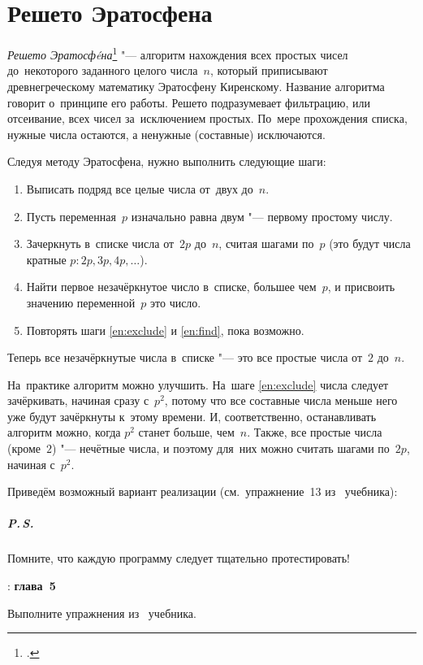\section{Решето Эратосфена}
\emph{Решето Эратосф\'eна}\footcite{Eratosthen:wiki} "--- алгоритм нахождения всех простых чисел до~некоторого заданного целого числа~\(n\), который приписывают древнегреческому математику Эратосфену Киренскому. Название алгоритма говорит о~принципе его работы. Решето подразумевает фильтрацию, или отсеивание, всех чисел за~исключением простых. По~мере прохождения списка, нужные числа остаются, а ненужные (составные) исключаются.

Следуя методу Эратосфена, нужно выполнить следующие шаги:
\begin{enumerate}
    \item Выписать подряд все целые числа от~двух до~\(n\).
    \item Пусть переменная~\(p\) изначально равна двум "--- первому простому числу.
    \item\label{en:exclude} Зачеркнуть в~списке числа от~\(2p\) до~\(n\), считая шагами по~\(p\) (это будут числа кратные \(p\colon 2p, 3p, 4p,\ldots\)).
    \item\label{en:find} Найти первое незачёркнутое число в~списке, большее чем~\(p\), и присвоить значению переменной~\(p\) это число.
    \item Повторять шаги \ref{en:exclude} и \ref{en:find}, пока возможно.
\end{enumerate}
Теперь все незачёркнутые числа в~списке "--- это все простые числа от~\(2\) до~\(n\).

На~практике алгоритм можно улучшить. На~шаге \ref{en:exclude} числа следует зачёркивать, начиная сразу с~\(p^2\), потому что все составные числа меньше него уже будут зачёркнуты к~этому времени. И, соответственно, останавливать алгоритм можно, когда \(p^2\) станет больше, чем~\(n\). Также, все простые числа (кроме~\(2\)) "--- нечётные числа, и поэтому для~них можно считать шагами по~\(2p\), начиная с~\(p^2\).

Приведём возможный вариант реализации (см.~упражнение~13 из~ учебника):

\subparagraph{P.\,S.}
Помните, что каждую программу следует тщательно протестировать!



\WhatToReadSection
\textcite{Stroustrup:2016:ru}: \textbf{глава~5}


\ExercisesSection
\begin{exercise}
\item Выполните упражнения из~ учебника.

\end{exercise}
